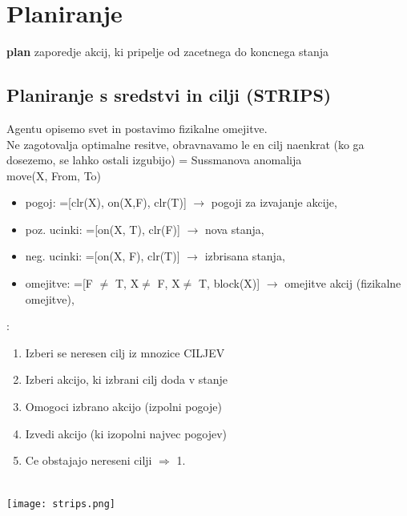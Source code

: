 \section{Planiranje}

\textbf{plan} zaporedje akcij, ki pripelje od zacetnega do koncnega stanja

\subsection{Planiranje s sredstvi in cilji (STRIPS)}
Agentu opisemo svet in postavimo fizikalne omejitve.\\
Ne zagotovalja optimalne resitve, obravnavamo le en cilj naenkrat (ko ga dosezemo, se lahko ostali izgubijo) = Sussmanova anomalija\\
 move(X, From, To)
\begin{itemize}[noitemsep,topsep=0pt,leftmargin=*]
    \item pogoj: =[clr(X), on(X,F), clr(T)] $\rightarrow$ pogoji za izvajanje akcije,
    \item poz. ucinki: =[on(X, T), clr(F)] $\rightarrow$ nova stanja,
    \item neg. ucinki: =[on(X, F), clr(T)] $\rightarrow$ izbrisana stanja,
    \item omejitve: =[F $\neq$ T, X$\neq$ F, X$\neq$ T, block(X)] $\rightarrow$ omejitve akcij (fizikalne omejitve),
\end{itemize}
:
\begin{enumerate}[noitemsep,topsep=0pt,leftmargin=*]
    \item Izberi se neresen cilj iz mnozice CILJEV
    \item Izberi akcijo, ki izbrani cilj doda v stanje
    \item Omogoci izbrano akcijo (izpolni pogoje)
    \item Izvedi akcijo (ki izopolni najvec pogojev)
    \item Ce obstajajo nereseni cilji $\Rightarrow$ 1.
\end{enumerate}
\\
\texttt{[image: strips.png]}
